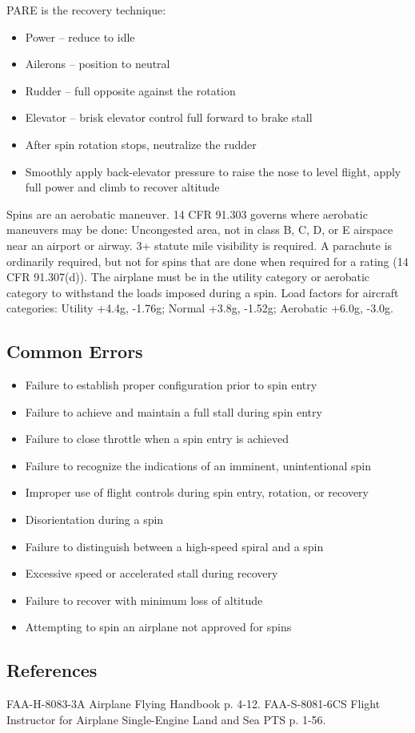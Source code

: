 PARE is the recovery technique:

\begin{itemize}
  \item Power -- reduce to idle
  \item Ailerons -- position to neutral
  \item Rudder -- full opposite against the rotation
  \item Elevator -- brisk elevator control full forward to brake stall
  \item After spin rotation stops, neutralize the rudder 
  \item Smoothly apply back-elevator pressure to raise the nose to level
    flight, apply full power and climb to recover altitude
\end{itemize}

Spins are an aerobatic maneuver. 14 CFR 91.303 governs where aerobatic
maneuvers may be done: Uncongested area, not in class B, C, D, or E airspace
near an airport or airway. 3+ statute mile visibility is required. A parachute
is ordinarily required, but not for spins that are done when required for a
rating (14 CFR 91.307(d)). The airplane must be in the utility category or
aerobatic category to withstand the loads imposed during a spin. Load factors
for aircraft categories: Utility +4.4g, -1.76g; Normal +3.8g, -1.52g; Aerobatic
+6.0g, -3.0g.

\subsection{Common Errors}

\begin{itemize}
  \item Failure to establish proper configuration prior to spin entry
  \item Failure to achieve and maintain a full stall during spin entry
  \item Failure to close throttle when a spin entry is achieved
  \item Failure to recognize the indications of an imminent, unintentional spin
  \item Improper use of flight controls during spin entry, rotation, or
    recovery
  \item Disorientation during a spin
  \item Failure to distinguish between a high-speed spiral and a spin
  \item Excessive speed or accelerated stall during recovery
  \item Failure to recover with minimum loss of altitude
  \item Attempting to spin an airplane not approved for spins
\end{itemize}

\subsection{References}

FAA-H-8083-3A Airplane Flying Handbook p. 4-12.
FAA-S-8081-6CS Flight Instructor for Airplane Single-Engine Land and Sea PTS p.
1-56.

